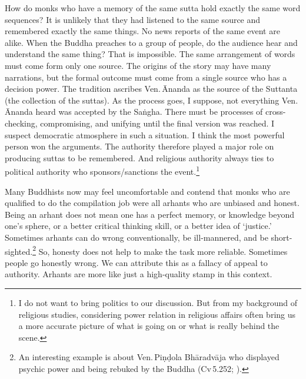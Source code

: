 How do monks who have a memory of the same sutta hold exactly the same word sequences? It is unlikely that they had listened to the same source and remembered exactly the same things. No news reports of the same event are alike. When the Buddha preaches to a group of people, do the audience hear and understand the same thing? That is impossible. The same arrangement of words must come form only one source. The origins of the story may have many narrations, but the formal outcome must come from a single source who has a decision power. The tradition ascribes Ven.\,\=Ananda as the source of the Suttanta (the collection of the suttas). As the process goes, I suppose, not everything Ven.\,\=Ananda heard was accepted by the Sa\.ngha. There must be processes of cross-checking, compromising, and unifying until the final version was reached. I suspect democratic atmosphere in such a situation. I think the most powerful person won the arguments. The authority therefore played a major role on producing suttas to be remembered. And religious authority always ties to political authority who sponsors/sanctions the event.\footnote{I do not want to bring politics to our discussion. But from my background of religious studies, considering power relation in religious affairs often bring us a more accurate picture of what is going on or what is really behind the scene.}

Many Buddhists now may feel uncomfortable and contend that monks who are qualified to do the compilation job were all arhants who are unbiased and honest. Being an arhant does not mean one has a perfect memory, or knowledge beyond one's sphere, or a better critical thinking skill, or a better idea of `justice.' Sometimes arhants can do wrong conventionally, be ill-mannered, and be short-sighted.\footnote{An interesting example is about Ven.\,Pi\d n\d dola Bh\=aradv\=aja who displayed psychic power and being rebuked by the Buddha (Cv\,5.252; \citealp[p.~790]{thanissaro:code}).} So, honesty does not help to make the task more reliable. Sometimes people go honestly wrong. We can attribute this as a fallacy of appeal to authority. Arhants are more like just a high-quality stamp in this context.

